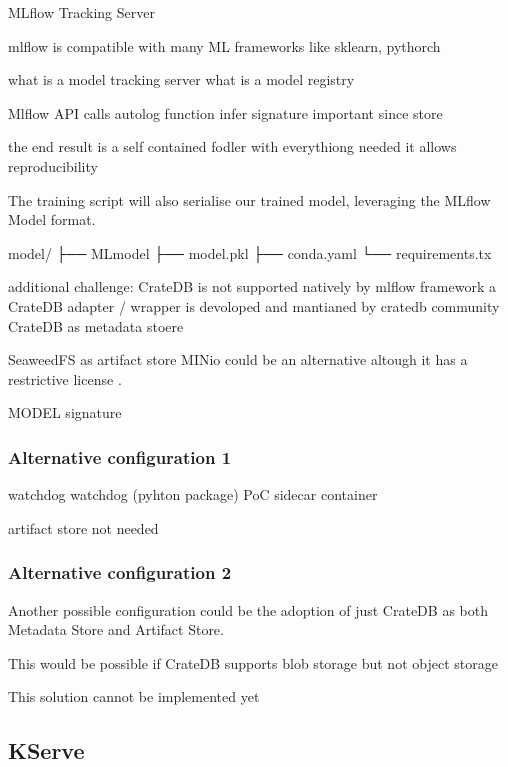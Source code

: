 MLflow Tracking Server


mlflow is compatible with many ML frameworks like sklearn, pythorch


what is a model tracking server
what is a model registry



Mlflow API calls
autolog function
infer signature 
important since store 

the end result is a self contained fodler with everythiong needed 
it allows reproducibility 

The training script will also serialise our trained model, leveraging the MLflow Model format.


model/
├── MLmodel
├── model.pkl
├── conda.yaml
└── requirements.tx


additional challenge: CrateDB is not supported natively by mlflow framework
a CrateDB adapter / wrapper is devoloped and mantianed by cratedb community
CrateDB as metadata stoere


SeaweedFS as artifact store
MINio could be an alternative altough it has a restrictive license \cite{minio_license}.



MODEL signature




\subsubsection{Alternative configuration 1}

watchdog
watchdog (pyhton package)
PoC
sidecar container

artifact store not needed

\subsubsection{Alternative configuration 2}

Another possible configuration could be the adoption of just CrateDB as both Metadata Store and Artifact Store.

This would be possible if
CrateDB supports blob storage but not object storage

This solution cannot be implemented yet




\subsection{KServe}


